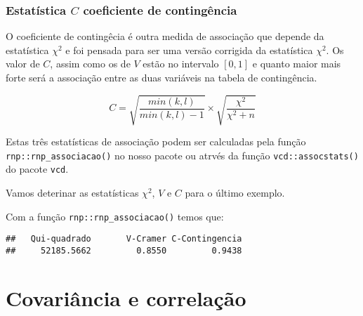 \documentclass[11pt,]{style/krantz}
\makeatletter
\newenvironment{Shaded}{\begin{snugshade}}{\end{snugshade}}
\newcommand{\DataTypeTok}[1]{\textcolor[rgb]{0.13,0.29,0.53}{#1}}
\newcommand{\KeywordTok}[1]{\textcolor[rgb]{0.13,0.29,0.53}{\textbf{#1}}}
\newcommand{\NormalTok}[1]{#1}
\newcommand{\OperatorTok}[1]{\textcolor[rgb]{0.81,0.36,0.00}{\textbf{#1}}}
\newcommand{\StringTok}[1]{\textcolor[rgb]{0.31,0.60,0.02}{#1}}
\newenvironment{kframe}{%
\medskip{}
\setlength{\fboxsep}{.8em}
 \def\at@end@of@kframe{}%
 \ifinner\ifhmode%
  \def\at@end@of@kframe{\end{minipage}}%
  \begin{minipage}{\columnwidth}%
 \fi\fi%
 \def\FrameCommand##1{\hskip\@totalleftmargin \hskip-\fboxsep
 \colorbox{shadecolor}{##1}\hskip-\fboxsep
     \hskip-\linewidth \hskip-\@totalleftmargin \hskip\columnwidth}%
 \MakeFramed {\advance\hsize-\width
   \@totalleftmargin\z@ \linewidth\hsize
   \@setminipage}}%
 {\par\unskip\endMakeFramed%
 \at@end@of@kframe}
\renewenvironment{Shaded}{\begin{kframe}}{\end{kframe}}
\theoremstyle{definition}
\theoremstyle{definition}
\theoremstyle{definition}
\theoremstyle{remark}
\let\BeginKnitrBlock\begin \let\EndKnitrBlock\end
\makeatother
\begin{document}
\hypertarget{estatistica-c-coeficiente-de-contingencia}{%
\subsubsection{\texorpdfstring{Estatística \(C\) coeficiente de contingência}{Estatística C coeficiente de contingência}}\label{estatistica-c-coeficiente-de-contingencia}}

O coeficiente de contingêcia é outra medida de associação que depende da estatística \(\chi^ 2\) e foi pensada para ser uma versão corrigida da estatística \(\chi^2\). Os valor de \(C\), assim como os de \(V\) estão no intervalo \([0,1]\) e quanto maior mais forte será a associação entre as duas variáveis na tabela de contingência.

\[C = \sqrt{\frac{min(k,l)}{min(k,l)-1}} \times \sqrt{\frac{\chi^2}{\chi^2 + n}} \]

Estas três estatísticas de associação podem ser calculadas pela função \texttt{rnp::rnp\_associacao()} no nosso pacote ou atrvés da função \texttt{vcd::assocstats()} do pacote \texttt{vcd}.

\BeginKnitrBlock{exercise}
\protect\hypertarget{exr:unnamed-chunk-99}{}{\label{exr:unnamed-chunk-99} }Vamos deterinar as estatísticas \(\chi^2\), \(V\) e \(C\) para o último exemplo.
\EndKnitrBlock{exercise}

\BeginKnitrBlock{solution}
\iffalse{} {Solução. } \fi{}Com a função \texttt{rnp::rnp\_associacao()} temos que:
\EndKnitrBlock{solution}

\begin{Shaded}
\end{Shaded}

\begin{verbatim}
##   Qui-quadrado       V-Cramer C-Contingencia
##     52185.5662         0.8550         0.9438
\end{verbatim}

\hypertarget{covariancia-e-correlacao}{%
\section{Covariância e correlação}\label{covariancia-e-correlacao}}
\end{document}
